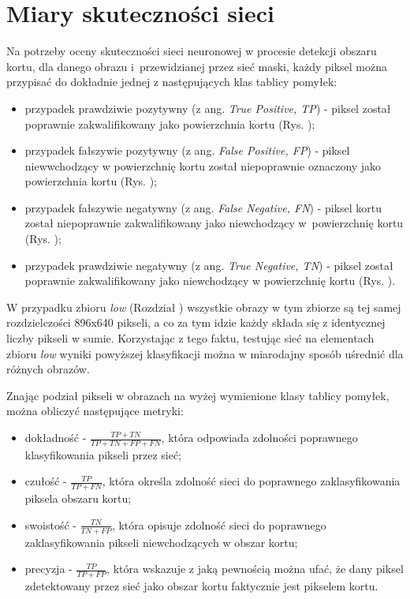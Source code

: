 \section{Miary skuteczności sieci}

Na potrzeby oceny skuteczności sieci neuronowej w procesie detekcji obszaru kortu, dla danego obrazu i~przewidzianej przez sieć maski, każdy piksel można przypisać do dokładnie jednej z następujących klas tablicy pomyłek:

\begin{itemize}
  \item przypadek prawdziwie pozytywny (z ang. \textit{True Positive, TP}) - piksel został poprawnie zakwalifikowany jako powierzchnia kortu (Rys. );
  \item przypadek fałszywie pozytywny (z ang. \textit{False Positive, FP}) - piksel niewwchodzący w powierzchnię kortu został niepoprawnie oznaczony jako powierzchnia kortu (Rys. );
  \item przypadek fałszywie negatywny (z ang. \textit{False Negative, FN}) - piksel kortu został niepoprawnie zakwalifikowany jako niewchodzący w~powierzchnię kortu (Rys. );
  \item przypadek prawdziwie negatywny (z ang. \textit{True Negative, TN}) - piksel został poprawnie zakwalifikowany jako niewchodzący w powierzchnię kortu (Rys. ).
\end{itemize}

W przypadku zbioru \textit{low} (Rozdział ) wszystkie obrazy w tym zbiorze są tej samej rozdzielczości 896x640 pikseli, a co za tym idzie każdy składa się z identycznej liczby pikseli w sumie.
Korzystając z tego faktu, testując sieć na elementach zbioru \textit{low} wyniki powyższej klasyfikacji można w miarodajny sposób uśrednić dla różnych obrazów.

Znając podział pikseli w obrazach na wyżej wymienione klasy tablicy pomyłek, można obliczyć następujące metryki:

\begin{itemize}
  \label{sec:miary}
  \item dokładność - $ \frac{TP + TN}{TP + TN + FP + FN} $, która odpowiada zdolności poprawnego klasyfikowania pikseli przez sieć;
  \item czułość - $ \frac{TP}{TP + FN} $, która określa zdolność sieci do poprawnego zaklasyfikowania piksela obszaru kortu;
  \item swoistość - $ \frac{TN}{TN + FP} $, która opisuje zdolność sieci do poprawnego zaklasyfikowania pikseli niewchodzących w obszar kortu; 
  \item precyzja - $ \frac{TP}{TP + FP} $, która wskazuje z jaką pewnością można ufać, że dany piksel zdetektowany przez sieć jako obszar kortu faktycznie jest pikselem kortu.
\end{itemize}

